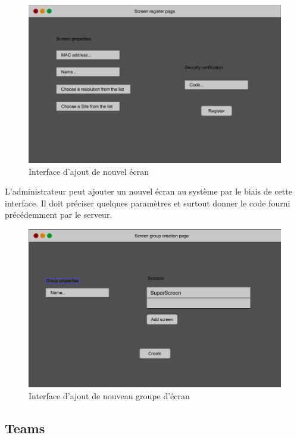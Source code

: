 \documentclass[french]{article}
\begin{document}
	\begin{figure}[h]
		\centering
		\includegraphics[scale=0.4]{mockup/m_screen_register}
		\caption{Interface d'ajout de nouvel écran}
		\label{fig:screenRegister}
	\end{figure}
	
	L'administrateur peut ajouter un nouvel écran au système par le biais de cette interface. Il doit préciser quelques paramètres et surtout donner le code fourni précédemment par le serveur.
	
	\begin{figure}[h]
		\centering
		\includegraphics[scale=0.4]{mockup/m_group_creation}
		\caption{Interface d'ajout de nouveau groupe d'écran}
		\label{fig:groupCreation}
	\end{figure}
	
\newpage
\subsection{Teams}
\end{document}
